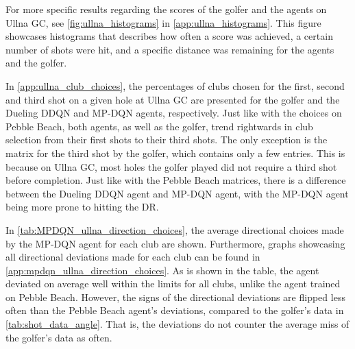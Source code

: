 \documentclass{kththesis}
\begin{document}
For more specific results regarding the scores of the golfer and the agents on Ullna GC, see \autoref{fig:ullna_histograms} in \autoref{app:ullna_histograms}. This figure showcases histograms that describes how often a score was achieved, a certain number of shots were hit, and a specific distance was remaining for the agents and the golfer.

In \autoref{app:ullna_club_choices}, the percentages of clubs chosen for the first, second and third shot on a given hole at Ullna GC are presented for the golfer and the Dueling DDQN and MP-DQN agents, respectively. Just like with the choices on Pebble Beach, both agents, as well as the golfer, trend rightwards in club selection from their first shots to their third shots. The only exception is the matrix for the third shot by the golfer, which contains only a few entries. This is because on Ullna GC, most holes the golfer played did not require a third shot before completion. Just like with the Pebble Beach matrices, there is a difference between the Dueling DDQN agent and MP-DQN agent, with the MP-DQN agent being more prone to hitting the DR.

In \autoref{tab:MPDQN_ullna_direction_choices}, the average directional choices made by the MP-DQN agent for each club are shown. Furthermore, graphs showcasing all directional deviations made for each club can be found in \autoref{app:mpdqn_ullna_direction_choices}. As is shown in the table, the agent deviated on average well within the limits for all clubs, unlike the agent trained on Pebble Beach. However, the signs of the directional deviations are flipped less often than the Pebble Beach agent's deviations, compared to the golfer's data in \autoref{tab:shot_data_angle}. That is, the deviations do not counter the average miss of the golfer's data as often.
\end{document}
